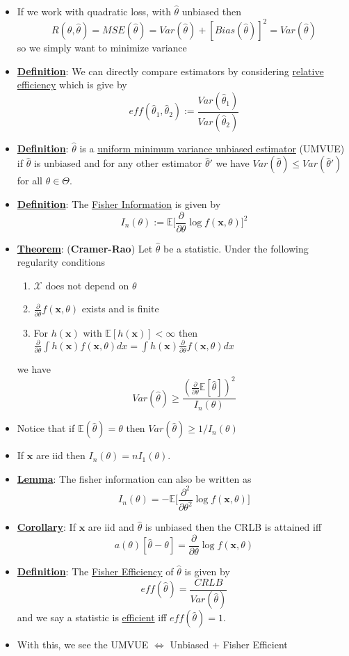 \documentclass{article}
\newcommand{\E}{{\mathbb{E}}}
\newcommand{\x}{{\textbf{x}}}
\begin{document}
\begin{itemize}
\item If we work with quadratic loss, with $\hat{\theta}$ unbiased then $$R(\theta, \hat{\theta}) = MSE(\hat{\theta}) = Var(\hat{\theta}) + [Bias(\hat{\theta})]^2 = Var(\hat{\theta})$$ so we simply want to minimize variance
\item \underline{\textbf{Definition}}: We can directly compare estimators by considering \underline{relative efficiency} which is give by $$eff(\hat{\theta}_1,\hat{\theta}_2) := \frac{Var(\hat{\theta}_1)}{Var(\hat{\theta}_2)}$$
\item \underline{\textbf{Definition}}: $\hat{\theta}$ is a \underline{uniform minimum variance unbiased estimator} (UMVUE) if $\hat{\theta}$ is unbiased and for any other estimator $\hat{\theta}'$ we have $Var(\hat{\theta})\leq Var(\hat{\theta}')$ for all $\theta\in\Theta$. 
\item \underline{\textbf{Definition}}: The \underline{Fisher Information} is given by $$I_n(\theta):= \E\Big[\frac{\partial}{\partial\theta}\log f(\x,\theta)\Big]^2$$
\item \underline{\textbf{Theorem}}: (\textbf{Cramer-Rao}) Let $\hat{\theta}$ be a statistic. Under the following regularity conditions \begin{enumerate}
\item $\mathcal{X}$ does not depend on $\theta$
\item $\frac{\partial}{\partial\theta}f(\x,\theta)$ exists and is finite
\item For $h(\x)$ with $\E[h(\x)]<\infty$ then $\frac{\partial}{\partial\theta}\int h(\x)f(\x,\theta)dx = \int h(\x)\frac{\partial}{\partial\theta}f(\x,\theta)dx$
\end{enumerate}
we have $$Var(\hat{\theta})\geq \frac{\left(\frac{\partial}{\partial\theta}\E[\hat{\theta}]\right)^2}{I_n(\theta)}$$
\item Notice that if $\E(\hat{\theta}) = \theta$ then $Var(\hat{\theta})\geq 1/I_n(\theta)$
\item If $\x$ are iid then $I_n(\theta) = nI_1(\theta)$.
\item \underline{\textbf{Lemma}}: The fisher information can also be written as $$I_n(\theta) = -\E\Big[\frac{\partial^2}{\partial\theta^2}\log f(\x,\theta)\Big]$$
\item \underline{\textbf{Corollary}}: If $\x$ are iid and $\hat{\theta}$ is unbiased then the CRLB is attained iff $$a(\theta)[\hat{\theta} - \theta] = \frac{\partial}{\partial\theta}\log f(\x,\theta)$$
\item \underline{\textbf{Definition}}: The \underline{Fisher Efficiency} of $\hat{\theta}$ is given by $$eff(\hat{\theta}) = \frac{CRLB}{Var(\hat{\theta})}$$ and we say a statistic is \underline{efficient} iff $eff(\hat{\theta}) = 1$. 
\item With this, we see the UMVUE $\Longleftrightarrow$ Unbiased + Fisher Efficient 
\end{itemize}
\end{document}
